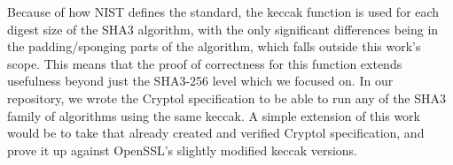 Because of how NIST defines the standard, the keccak function is used for each digest size of the SHA3 algorithm, with the only significant differences being in the padding/sponging parts of the algorithm, which falls outside this work's scope.
This means that the proof of correctness for this function extends usefulness beyond just the SHA3-256 level which we focused on.
In our repository, we wrote the Cryptol specification to be able to run any of the SHA3 family of algorithms using the same keccak.
A simple extension of this work would be to take that already created and verified Cryptol specification, and prove it up against OpenSSL's slightly modified keccak versions.